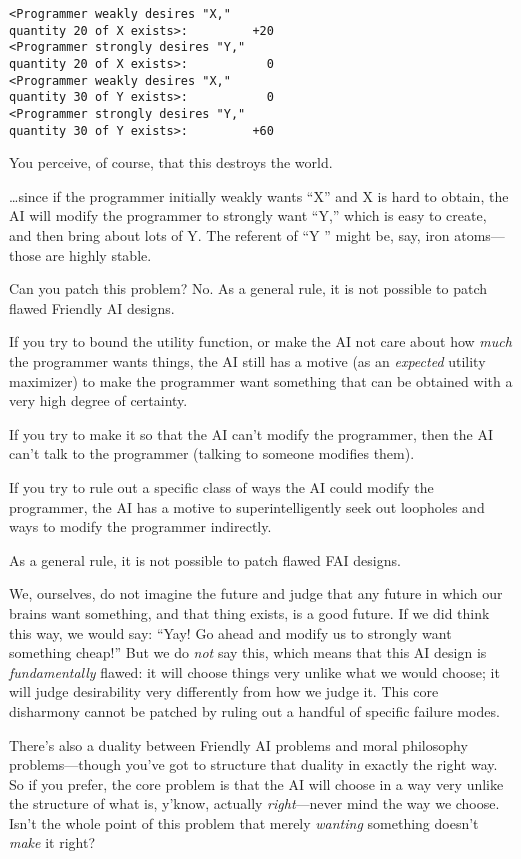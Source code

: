 \begin{verbatim}
<Programmer weakly desires "X,"
quantity 20 of X exists>:         +20
<Programmer strongly desires "Y,"
quantity 20 of X exists>:           0
<Programmer weakly desires "X,"
quantity 30 of Y exists>:           0
<Programmer strongly desires "Y,"
quantity 30 of Y exists>:         +60
\end{verbatim}


{
 You perceive, of course, that this destroys the world.}

{
 \ldots since if the programmer initially weakly wants
``X'' and X is hard to obtain, the
AI will modify the programmer to strongly want
``Y,'' which is easy to create, and
then bring about lots of Y. The referent of ``Y
'' might be, say, iron atoms---those are highly
stable.}

{
 Can you patch this problem? No. As a general rule, it is not
possible to patch flawed Friendly AI designs.}

{
 If you try to bound the utility function, or make the AI not care
about how \textit{much} the programmer wants things, the AI still has a
motive (as an \textit{expected} utility maximizer) to make the
programmer want something that can be obtained with a very high degree
of certainty.}

{
 If you try to make it so that the AI can't modify
the programmer, then the AI can't talk to the
programmer (talking to someone modifies them).}

{
 If you try to rule out a specific class of ways the AI could
modify the programmer, the AI has a motive to superintelligently seek
out loopholes and ways to modify the programmer indirectly.}

{
 As a general rule, it is not possible to patch flawed FAI
designs.}

{
 We, ourselves, do not imagine the future and judge that any future
in which our brains want something, and that thing exists, is a good
future. If we did think this way, we would say: ``Yay!
Go ahead and modify us to strongly want something
cheap!'' But we do \textit{not} say this, which means
that this AI design is \textit{fundamentally} flawed: it will choose
things very unlike what we would choose; it will judge desirability
very differently from how we judge it. This core disharmony cannot be
patched by ruling out a handful of specific failure modes.}

{
 There's also a duality between Friendly AI
problems and moral philosophy problems---though you've
got to structure that duality in exactly the right way. So if you
prefer, the core problem is that the AI will choose in a way very
unlike the structure of what is, y'know, actually
\textit{right}{}---never mind the way we choose. Isn't
the whole point of this problem that merely \textit{wanting} something
doesn't \textit{make} it right?}


